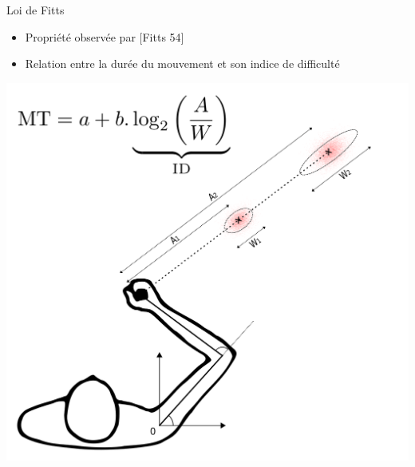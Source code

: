 %

\begin{frame}{Loi de Fitts}
    \begin{small}
        \begin{itemize}
            \item Propriété observée par $[$Fitts 54$]$
            \item Relation entre la durée du mouvement et son indice de difficulté
        \end{itemize}
    \end{small}
    \begin{center}
        \includegraphics[width=.55\linewidth]{fig/fitts_exp2}
    \end{center}
\end{frame}

